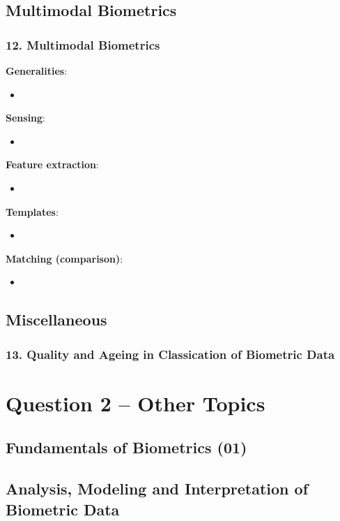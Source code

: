 \documentclass[a4paper]{article}
\begin{document}
  \subsection*{Multimodal Biometrics}
    \subsubsection*{12. Multimodal Biometrics}
      \textbf{Generalities}:
      \begin{itemize}
        \item 
      \end{itemize}

      \textbf{Sensing}:
      \begin{itemize}
        \item 
      \end{itemize}

      \textbf{Feature extraction}:
      \begin{itemize}
        \item 
      \end{itemize}

      \textbf{Templates}:
      \begin{itemize}
        \item 
      \end{itemize}

      \textbf{Matching (comparison)}:
      \begin{itemize}
        \item 
      \end{itemize}
  \subsection*{Miscellaneous}
    \subsubsection*{13. Quality and Ageing in Classication of Biometric Data}

\newpage

\section*{Question 2 -- Other Topics} %
\label{sec:question_2_other_topics}
  \subsection*{Fundamentals of Biometrics (01)}
    
  \subsection*{Analysis, Modeling and Interpretation of Biometric Data}
    
\end{document}
